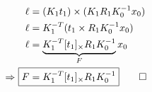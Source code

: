 \documentclass{article}
\begin{document}
\begin{alignat}{2}
\ell &= (K_1 t_1) \times (K_1 R_1 K_0^{-1} x_0) \label{eq:e5} \\
\nonumber
\ell &= K_1^{-T} (t_1 \times R_1 K_0^{-1} x_0) \\
\nonumber
\ell &= \underbrace{K_1^{-T} [t_1]_{\times} R_1 K_0^{-1}}_{F} x_0 \\
\Rightarrow ~ \Aboxed{F &= K_1^{-T} [t_1]_{\times} R_1 K_0^{-1}} \qed \label{eq:e6}
\end{alignat}









\end{document}
